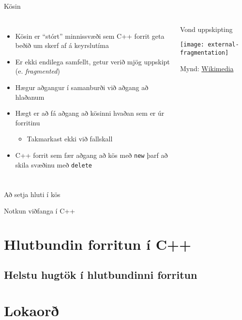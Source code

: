 \documentclass[handout]{beamer}
\begin{document}
\begin{frame}{Kösin}
\begin{columns}
\begin{itemize}
 \item Kösin er ``stórt'' minnissvæði sem C++ forrit geta beðið um skerf af á keyrslutíma
 \item Er ekki endilega samfellt, getur verið mjög uppskipt (e. \emph{fragmented})
 \item Hægur aðgangur í samanburði við aðgang að hlaðanum
 \item Hægt er að fá aðgang að kösinni hvaðan sem er úr forritinu
 \begin{itemize}
  \item Takmarkast ekki við fallskall
 \end{itemize}
 \item C++ forrit sem fær aðgang að kös með \texttt{new} þarf að skila svæðinu með \texttt{delete}
\end{itemize}
\begin{center}
Vond uppskipting

\texttt{[image: external-fragmentation]}

{\tiny Mynd: \href{https://commons.wikimedia.org/wiki/File:External_Fragmentation.svg}{Wikimedia}}
\end{center}
\end{columns}
\end{frame}

\begin{frame}{Að setja hluti í kös}

\end{frame}

\begin{frame}{Notkun viðfanga í C++}

\end{frame}


\section{Hlutbundin forritun í C++}

\subsection{Helstu hugtök í hlutbundinni forritun}




\section{Lokaorð}
\end{document}
